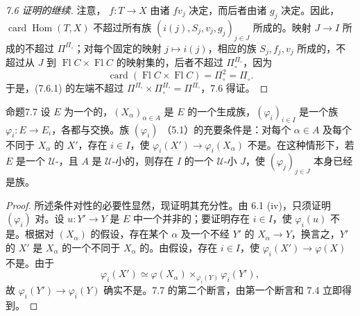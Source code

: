 \begin{proof}[7.6 证明的继续]
注意， $f:T\to X$ 由诸 $fv_j$ 决定，而后者由诸 $g_j$ 决定。因此，$\operatorname{card}\operatorname{Hom}(T,X)$ 不超过所有族 $(i(j),S_j,v_j,g_j)_{j\in J}$ 所成的。映射 $J\to I$ 所成的不超过 $\Pi^{\Pi_\circ}$；对每个固定的映射 $j\mapsto i(j)$，相应的族 $S_j,f_j,v_j$ 所成的，不超过从 $J$ 到 $\operatorname{Fl}C\times\operatorname{Fl}C$ 的映射集的，后者不超过 $\Pi_\circ^{\Pi_\circ}$，因为
\[
\operatorname{card}(\operatorname{Fl}C\times\operatorname{Fl}C)=\Pi_\circ^2=\Pi_\circ.
\]
于是，(7.6.1) 的左端不超过 $\Pi^{\Pi_\circ}\times\Pi_\circ^{\Pi_\circ}=\Pi^{\Pi_\circ}$，7.6 得证。
\end{proof}
\begin{SGAresult}{命题}{7.7}
设 $E$ 为一个的，$(X_\alpha)_{\alpha\in A}$ 是 $E$ 的一个生成族，$(\varphi_i)_{i\in I}$ 是一个族 $\varphi_i:E\to E_i$，各都与交换。族 $(\varphi_i)$ （5.1）的充要条件是：对每个 $\alpha\in A$ 及每个不同于 $X_\alpha$ 的 $X'$，存在 $i\in I$，使 $\varphi_i(X')\to\varphi_i(X_\alpha)$ 不是。在这种情形下，若 $E$ 是一个 $\mathcal U$-，且 $A$ 是 $\mathcal U$-小的，则存在 $I$ 的一个 $\mathcal U$-小 $J$，使 $(\varphi_j)_{j\in J}$ 本身已经是族。
\end{SGAresult}
\begin{proof}
所述条件对性的必要性显然，现证明其充分性。由 6.1 (iv)，只须证明 $(\varphi_i)$ 对。设 $u:Y'\to Y$ 是 $E$ 中一个并非的；要证明存在 $i\in I$，使 $\varphi_i(u)$ 不是。根据对 $(X_\alpha)$ 的假设，存在某个 $\alpha$ 及一个不经 $Y'$ 的 $X_\alpha\to Y$，换言之，$Y'$ 的 $X'$ 是 $X_\alpha$ 的一个不同于 $X_\alpha$ 的。由假设，存在 $i\in I$，使 $\varphi_i(X')\to\varphi(X)$ 不是。由于
\[
\varphi_i(X')\simeq\varphi(X_\alpha)\times_{\varphi_i(Y)}\varphi_i(Y'),
\]
故 $\varphi_i(Y')\to\varphi_i(Y)$ 确实不是。7.7 的第二个断言，由第一个断言和 7.4 立即得到。
\end{proof}
